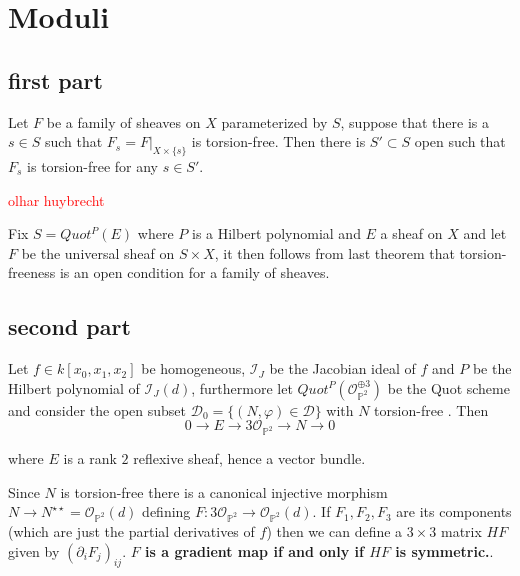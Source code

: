 \section{Moduli}
\subsection{first part}
\begin{theorem}
Let $F$ be a family of sheaves on $X$ parameterized by $S$, suppose that there is a $s \in S$ such that $F_s = F|_{X \times \{s \}}$ is torsion-free. Then there is $S' \subset S$ open such that $F_s$ is torsion-free for any $s \in S'$.
\end{theorem}
\begin{dem}
\textcolor{red}{olhar huybrecht}
\end{dem}
Fix $S=Quot^P(E)$ where $P$ is a Hilbert polynomial and $E$ a sheaf on $X$ and let $F$ be the universal sheaf on $S \times X$, it then follows from last theorem that torsion-freeness is an open condition for a family of sheaves.
\subsection{second part}

Let $f \in k[x_0,x_1,x_2]$ be homogeneous, $\mathcal{I}_J$ be the Jacobian ideal of $f$ and $P$ be the Hilbert polynomial of $\mathcal{I}_J(d)$, furthermore let $Quot^P(\mathcal{O}_{\mathbb{P}^2}^{\oplus 3})$ be the Quot scheme and consider the open subset $\mathcal{D}_0 = \{(N,\varphi) \in \mathcal{D} \}$ with $N$ torsion-free \cite[Proposition 2.1]{Maruyama1976OpennessOA}. Then
\begin{equation}\label{main}
0 \to E \to 3\mathcal{O}_{\mathbb{P}^2} \to N \to 0 
\end{equation}

where $E$ is a rank $2$ reflexive sheaf, hence a vector bundle.

Since $N$ is torsion-free there is a canonical injective morphism $N \to N^{\star \star} = \mathcal{O}_{\mathbb{P}^2}(d)$ defining $F:3\mathcal{O}_{\mathbb{P}^2} \to \mathcal{O}_{\mathbb{P}^2}(d)$. If $F_1,F_2,F_3$ are its components (which are just the partial derivatives of $f$) then we can define a $3 \times 3$ matrix $H F$ given by $(\partial_i F_j)_{ij}$. \textbf{$F$ is a gradient map if and only if $H F$ is symmetric.}.



